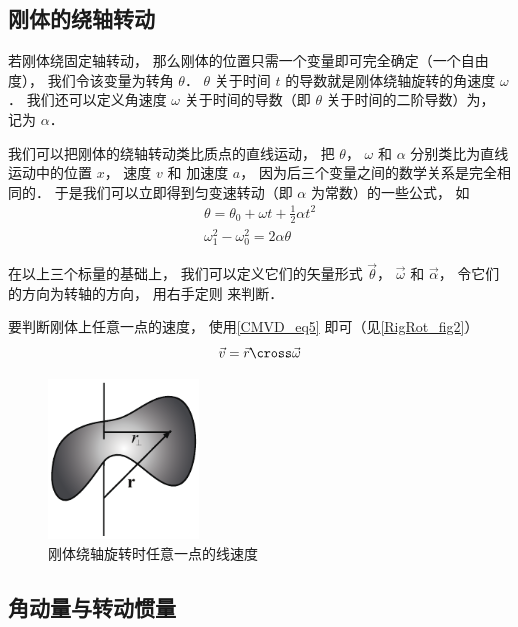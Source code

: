 

\subsection{刚体的绕轴转动}

若刚体绕固定轴转动， 那么刚体的位置只需一个变量即可完全确定（一个自由度）， 我们令该变量为转角 $\theta$． $\theta$ 关于时间 $t$ 的导数就是刚体绕轴旋转的角速度 $\omega$． 我们还可以定义角速度 $\omega$ 关于时间的导数（即 $\theta$ 关于时间的二阶导数）为， 记为 $\alpha$．

我们可以把刚体的绕轴转动类比质点的直线运动， 把 $\theta$， $\omega$ 和 $\alpha$ 分别类比为直线运动中的位置 $x$， 速度 $v$ 和 加速度 $a$， 因为后三个变量之间的数学关系是完全相同的． 于是我们可以立即得到匀变速转动（即 $\alpha$ 为常数）的一些公式， 如
\begin{gather}
\theta = \theta_0 + \omega t + \frac12 \alpha t^2\\
\omega_1^2 - \omega_0^2 = 2\alpha \theta
\end{gather}

在以上三个标量的基础上， 我们可以定义它们的矢量形式 $\vec \theta$， $\vec \omega$ 和 $\vec \alpha$， 令它们的方向为转轴的方向， 用右手定则 来判断．

要判断刚体上任意一点的速度， 使用\autoref{CMVD_eq5} 即可（见\autoref{RigRot_fig2}）
\begin{equation}
\vec v = \vec r \cross \vec \omega
\end{equation}

\begin{figure}[ht]
\centering
\includegraphics[width=4cm]{./figures/RigRot2.pdf}
\caption{刚体绕轴旋转时任意一点的线速度} \label{RigRot_fig2}
\end{figure}

\subsection{角动量与转动惯量}

